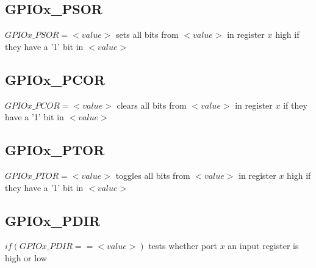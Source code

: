 \documentclass[CMPE]{KGCOEReport}
\begin{document}
\subsection*{GPIOx\_PSOR}
$GPIOx\_PSOR = <value>$ sets all bits from $<value>$ in register $x$ high if they have a '1' bit in $<value>$

\subsection*{GPIOx\_PCOR}
$GPIOx\_PCOR = <value>$ clears all bits from $<value>$ in register $x$ if they have a '1' bit in $<value>$

\subsection*{GPIOx\_PTOR}
$GPIOx\_PTOR = <value>$ toggles all bits from $<value>$ in register $x$ high if they have a '1' bit in $<value>$

\subsection*{GPIOx\_PDIR}
$if (GPIOx\_PDIR == <value>)$ tests whether port $x$ an input register is high or low

\newpage

\end{document}
